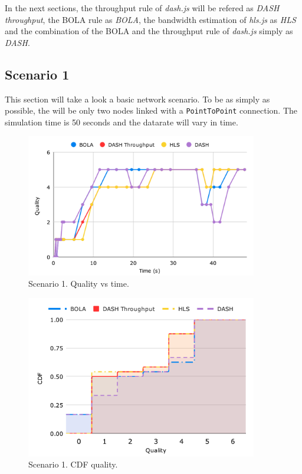 In the next sections, the throughput rule of \textit{dash.js} will be refered as \textit{DASH throughput},
the BOLA rule as \textit{BOLA}, the bandwidth estimation of \textit{hls.js} as \textit{HLS} and the combination
of the BOLA and the throughput rule of \textit{dash.js} simply as \textit{DASH}.

\subsection{Scenario 1}
This section will take a look a basic network scenario. To be as simply as possible, the will be 
only two nodes linked with a \texttt{PointToPoint} connection. The simulation time is 50 seconds 
and the datarate will vary in time.

\begin{figure}[h]
    \centering
    \includegraphics[width=0.9\textwidth]{img/s1c1.pdf}
    \caption{Scenario 1. Quality vs time.}
    \label{fig:s1c1}
\end{figure}

\begin{figure}[h]
    \centering
    \includegraphics[width=0.9\textwidth]{img/s1c2.pdf}
    \caption{Scenario 1. CDF quality.}
    \label{fig:s1c2}
\end{figure}


